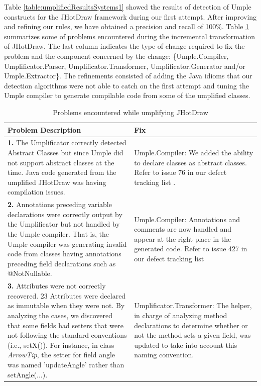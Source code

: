 Table \ref{table:umplifiedResultsSystems1} showed the results of detection of Umple constructs for the JHotDraw framework during our first attempt. After improving and refining our rules, we have obtained a precision and recall of 100\%. Table \ref{table:problemsJHotDraw} summarizes some of problems encountered during the incremental transformation of JHotDraw. The last column indicates the type of change required to fix the problem and the component concerned by the change: \{Umple.Compiler, Umplificator.Parser, Umplificator.Transformer, Umplificator.Generator and/or Umple.Extractor\}. The refinements consisted of adding the Java idioms that our detection algorithms were not able to catch on the first attempt and tuning the Umple compiler to generate compilable code from some of the umplified classes.

\begin{table}[htbp]
\caption{Problems encountered while umplifying JHotDraw}
\label{table:problemsJHotDraw}
\centering
\begin{tabularx}{\textwidth}{X|X}
\toprule
\rowcolor[HTML]{BBDAFF}
\textbf{Problem Description}  & \textbf{Fix}  \\ \hline
\textbf{1.} The Umplificator correctly detected Abstract Classes but since Umple did not support abstract classes at the time. Java code generated from the umplified JHotDraw was having compilation issues.
  & Umple.Compiler: We added the ability to declare classes as abstract classes. Refer to issue 76 in our defect tracking list \cite{UmpleIssues}.  \\\hline
 
\textbf{2.} Annotations preceding variable declarations were correctly output by the Umplificator but not handled by the Umple compiler. That is, the Umple compiler was generating invalid code from classes having annotations preceding field declarations such as @NotNullable.
 & Umple.Compiler: Annotations and comments are now handled and appear at the right place in the generated code.  Refer to issue 427 in our defect tracking list \cite{UmpleIssues}\\ \hline

\textbf{3.} Attributes were not correctly recovered. 23 Attributes were declared as immutable when they were not. By analyzing the cases, we discovered that some fields had setters that were not following the standard conventions (i.e., setX()). For instance, in class \textit{ArrowTip}, the setter for field angle was named 'updateAngle' rather than setAngle(...).
  &  Umplificator.Transformer: The helper, in charge of analyzing method declarations to determine whether or not the method sets a given field, was updated to take into account this naming convention.\\ \hline
  

\end{tabularx}
\end{table}
